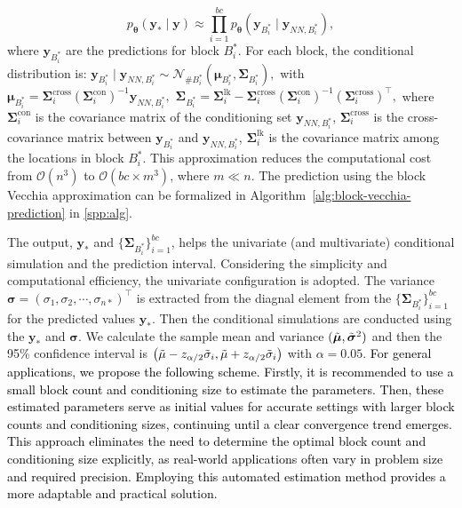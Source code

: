 \documentclass[12pt]{article}
\begin{document}
    \begin{equation}
        p_{\boldsymbol{\theta}}(\boldsymbol{y}_* \mid \boldsymbol{y}) \approx \prod_{i=1}^{bc} p_{\boldsymbol{\theta}} \left( \boldsymbol{y}_{B^*_i} \mid \boldsymbol{y}_{NN, B^*_i} \right),
    \end{equation}
where $\boldsymbol{y}_{B^*_i}$ are the predictions for block $B^*_i$. For each block, the conditional distribution is:
    $
    \boldsymbol{y}_{B^*_i} \mid \boldsymbol{y}_{NN, B^*_i} \sim \mathcal{N}_{\#B^*_i} \left(
    \boldsymbol{\mu}_{B^*_i}, \mathbf{\Sigma}_{B^*_i}
    \right),
    $
    with
    $
    \boldsymbol{\mu}_{B^*_i} = \mathbf{\Sigma}^{\text{cross}}_i \left( \mathbf{\Sigma}^{\text{con}}_i \right)^{-1} \boldsymbol{y}_{NN, B^*_i},
    $
    $
    \mathbf{\Sigma}_{B^*_i} = \mathbf{\Sigma}^{\text{lk}}_i - \mathbf{\Sigma}^{\text{cross}}_i \left( \mathbf{\Sigma}^{\text{con}}_i \right)^{-1} \left( \mathbf{\Sigma}^{\text{cross}}_i \right)^\top,
    $
    where $\mathbf{\Sigma}^{\text{con}}_i$ is the covariance matrix of the conditioning set $\boldsymbol{y}_{NN, B^*_i}$,
    $\mathbf{\Sigma}^{\text{cross}}_i$ is the cross-covariance matrix between $\boldsymbol{y}_{B^*_i}$ and $\boldsymbol{y}_{NN, B^*_i}$,
    $\mathbf{\Sigma}^{\text{lk}}_i$ is the covariance matrix among the locations in block $B^*_i$. This approximation reduces the computational cost from $\mathcal{O}(n^3)$ to $\mathcal{O}(bc \times m^3)$, where $m \ll n$. The prediction using the block Vecchia approximation can be formalized in Algorithm~\ref{alg:block-vecchia-prediction} in \ref{spp:alg}.

The output, $\boldsymbol{y}_*$ and $\{ \mathbf{\Sigma}_{B^*_i} \}_{i=1}^{bc}$, helps the univariate (and multivariate) conditional simulation and the prediction interval. Considering the simplicity and computational efficiency, the univariate configuration is adopted. The variance $\boldsymbol{\sigma} = \left( \sigma_1, \sigma_2, \cdots, \sigma_{n*} \right)^\top$ is extracted from the diagnal element from the $\{ \mathbf{\Sigma}_{B^*_i} \}_{i=1}^{bc}$ for the predicted values $\boldsymbol{y}_*$. Then the conditional simulations are conducted using the $\boldsymbol{y}_*$ and $\boldsymbol{\sigma}$. We calculate the sample mean and variance $(\Tilde{\boldsymbol{\mu}}, \Tilde{\boldsymbol{\sigma}}^2)$ and then the 95\% confidence interval is $\left(\Tilde{\mu} - z_{\alpha/2}\Tilde{\sigma}_i, \Tilde{\mu} + z_{\alpha/2}\Tilde{\sigma}_i\right)$ with $\alpha = 0.05$. \textcolor{black}{For general applications, we propose the following scheme. Firstly, it is recommended to use a small block count and conditioning size to estimate the parameters. Then, these estimated parameters serve as initial values for accurate settings with larger block counts and conditioning sizes, continuing until a clear convergence trend emerges. This approach eliminates the need to determine the optimal block count and conditioning size explicitly, as real-world applications often vary in problem size and required precision. Employing this automated estimation method provides a more adaptable and practical solution.}
\end{document}
